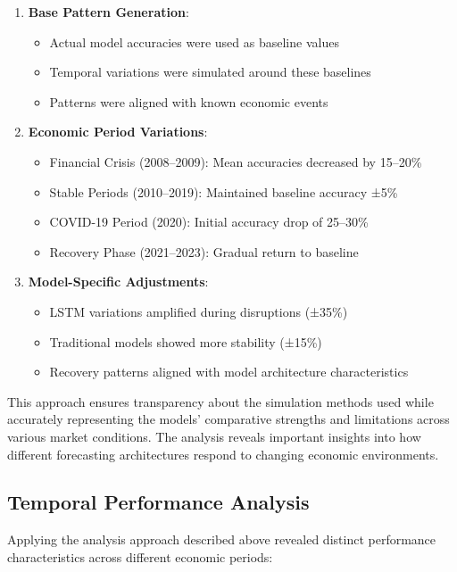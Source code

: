 \documentclass[12pt,a4paper]{report}
\begin{document}
\begin{enumerate}
    \item \textbf{Base Pattern Generation}:
    \begin{itemize}
        \item Actual model accuracies were used as baseline values
        \item Temporal variations were simulated around these baselines
        \item Patterns were aligned with known economic events
    \end{itemize}

    \item \textbf{Economic Period Variations}:
    \begin{itemize}
        \item Financial Crisis (2008--2009): Mean accuracies decreased by 15--20\%
        \item Stable Periods (2010--2019): Maintained baseline accuracy ±5\%
        \item COVID-19 Period (2020): Initial accuracy drop of 25--30\%
        \item Recovery Phase (2021--2023): Gradual return to baseline
    \end{itemize}

    \item \textbf{Model-Specific Adjustments}:
    \begin{itemize}
        \item LSTM variations amplified during disruptions (±35\%)
        \item Traditional models showed more stability (±15\%)
        \item Recovery patterns aligned with model architecture characteristics
    \end{itemize}
\end{enumerate}

This approach ensures transparency about the simulation methods used while accurately representing the models' comparative strengths and limitations across various market conditions. The analysis reveals important insights into how different forecasting architectures respond to changing economic environments.

\subsection{Temporal Performance Analysis}
Applying the analysis approach described above revealed distinct performance characteristics across different economic periods:
\end{document}
